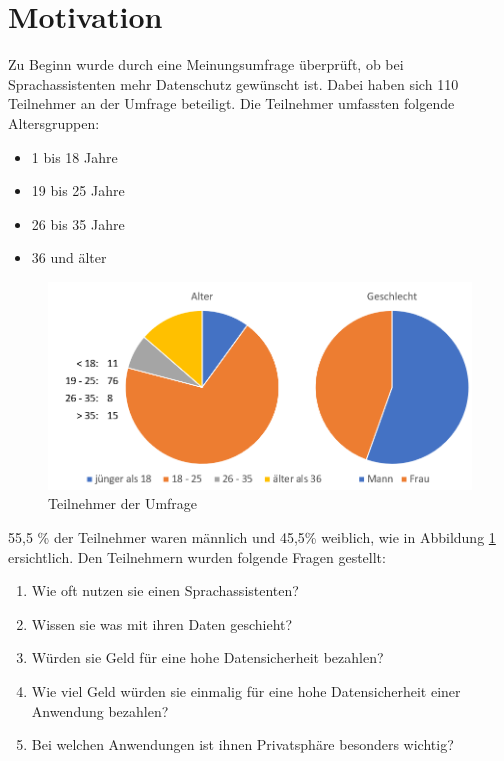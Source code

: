 \section{Motivation}\label{sec:motivaiton}
Zu Beginn wurde durch eine Meinungsumfrage überprüft, ob bei Sprachassistenten mehr Datenschutz gewünscht ist. Dabei haben sich 110 Teilnehmer an der Umfrage beteiligt. Die Teilnehmer umfassten folgende Altersgruppen:
\begin{itemize}
	\item 1 bis 18 Jahre 
	\item 19 bis 25 Jahre
	\item 26 bis 35 Jahre
	\item 36 und älter	
\end{itemize}

\begin{figure}[!h]
	\centering
	\includegraphics[width=0.9\linewidth]{Picture/umfrage_teilnehmer}
	\caption[Teilnehmer der Umfrage]{Teilnehmer der Umfrage}
	\label{fig:umfrage_teilnehmer}
\end{figure}

55,5 \% der Teilnehmer waren männlich und 45,5\%  weiblich, wie in Abbildung \ref{fig:umfrage_teilnehmer} ersichtlich. Den Teilnehmern wurden folgende Fragen gestellt:

\begin{enumerate}	
	\item Wie oft nutzen sie einen Sprachassistenten?
	\item Wissen sie was mit ihren Daten geschieht?
	\item Würden sie Geld für eine hohe Datensicherheit bezahlen?
	\item Wie viel Geld würden sie einmalig für eine hohe Datensicherheit einer Anwendung bezahlen?
	\item Bei welchen Anwendungen ist ihnen Privatsphäre besonders wichtig?	
\end{enumerate}

